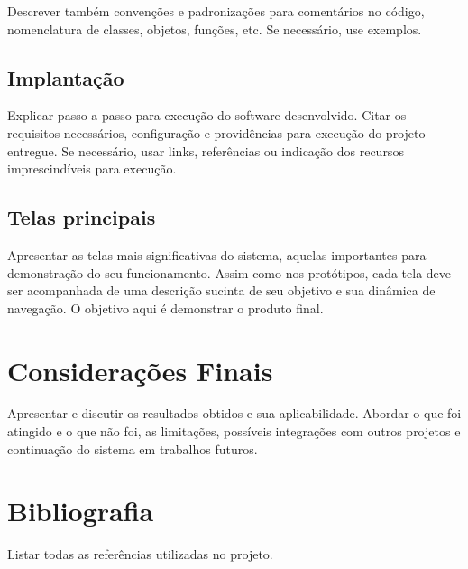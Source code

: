 \documentclass[a4paper,12pt]{article}
\begin{document}
Descrever também convenções e padronizações para comentários no código, nomenclatura de classes, objetos, funções, etc. Se necessário, use exemplos.

\subsection{Implantação}
Explicar passo-a-passo para execução do software desenvolvido. Citar os requisitos necessários, configuração e providências para execução do projeto entregue. Se necessário, usar links, referências ou indicação dos recursos imprescindíveis para execução.

\subsection{Telas principais}
Apresentar as telas mais significativas do sistema, aquelas importantes para demonstração do seu funcionamento. Assim como nos protótipos, cada tela deve ser acompanhada de uma descrição sucinta de seu objetivo e sua dinâmica de navegação. O objetivo aqui é demonstrar o produto final.

\newpage
\section{Considerações Finais}
Apresentar e discutir os resultados obtidos e sua aplicabilidade. Abordar o que foi atingido e o que não foi, as limitações, possíveis integrações com outros projetos e continuação do sistema em trabalhos futuros.

\newpage
\section{Bibliografia}

Listar todas as referências utilizadas no projeto.
\end{document}
